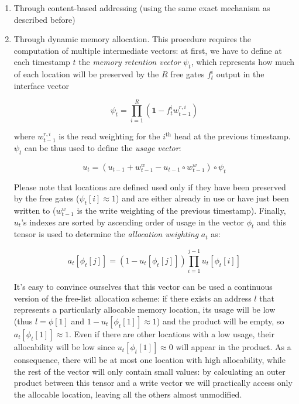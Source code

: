 \documentclass{article}
\begin{document}
\begin{enumerate}
    \item Through content-based addressing (using the same exact mechanism as described before)
    \item Through dynamic memory allocation. This procedure requires the computation of multiple intermediate vectors: at first, we have to define at each timestamp $t$ the \textit{memory retention vector} $\psi_t$, which represents how much of each location will be preserved by the $R$ free gates $f_t^i$ output in the interface vector

    \begin{equation}
        \psi_t = \prod_{i=1}^R (\mathbf{1}- f_t^i w_{t-1}^{r,i})
    \end{equation}

    where $w_{t-1}^{r,i}$ is the read weighting for the $i^{\textrm{th}}$ head at the previous timestamp. $\psi_t$ can be thus used to define the \textit{usage vector}:

    \begin{equation}
        u_t = (u_{t-1}+w_{t-1}^w-u_{t-1} \circ w_{t-1}^w) \circ \psi_t
    \end{equation}

    Please note that locations are defined used only if they have been preserved by the free gates ($\psi_t[i] \approx 1$) and are either already in use or have just been written to ($w_{t-1}^w$ is the write weighting of the previous timestamp).
    Finally, $u_t$'s indexes are sorted by ascending order of usage in the vector $\phi_t$ and this tensor is used to determine the \textit{allocation weighting} $a_t$ as:

    \begin{equation}\label{eq:allocation}
        a_t[\phi_t[j]] = (1-u_t[\phi_t[j]]) \prod_{i=1}^{j-1} u_t[\phi_t[i]]
    \end{equation}

    It's easy to convince ourselves that this vector can be used a continuous version of the free-list allocation scheme: if there exists an address $l$ that represents a particularly allocable memory location, its usage will be low (thus $l=\phi[1]$ and $1-u_t[\phi_t[1]] \approx 1$) and the product will be empty, so $a_t[\phi_t[1]] \approx 1$. Even if there are other locations with a low usage, their allocability will be low since $u_t[\phi_t[1]] \approx 0$ will appear in the product. As a consequence, there will be at most one location with high allocability, while the rest of the vector will only contain small values: by calculating an outer product between this tensor and a write vector we will practically access only the allocable location, leaving all the others almost unmodified.
\end{enumerate}
\end{document}

